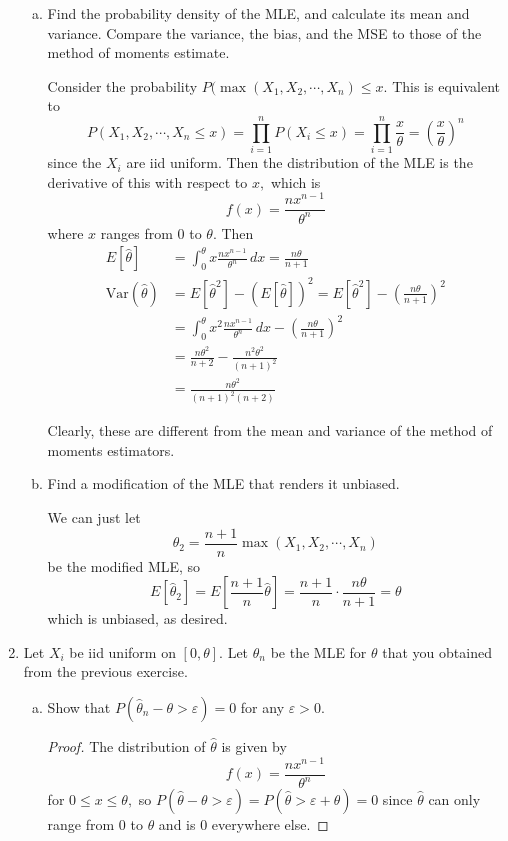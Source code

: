 \documentclass{article}
\newcommand{\var}{\mathrm{Var}}
\begin{document}
\begin{enumerate}
\begin{enumerate}[a.]
			\item Find the probability density of the MLE, and calculate its mean and variance. Compare the variance, the bias, and the MSE to those of the method of moments estimate.
				\begin{soln}
					Consider the probability $P(\max{(X_1, X_2, \cdots, X_n)\le x}.$ This is equivalent to \[P(X_1, X_2, \cdots, X_n\le x) = \prod_{i=1}^n P(X_i\le x) = \prod_{i=1}^n \frac{x}{\theta} = \left( \frac{x}{\theta} \right)^n\] since the $X_i$ are iid uniform. Then the distribution of the MLE is the derivative of this with respect to $x,$ which is \[f(x) = \frac{nx^{n-1}}{\theta^n}\] where $x$ ranges from 0 to $\theta.$ Then 
					\begin{align*}
						E[\hat{\theta}] &= \int_0^\theta x\frac{nx^{n-1}}{\theta^n}\, dx = \frac{n\theta}{n+1} \\
						\var(\hat{\theta}) &= E[\hat{\theta}^2]-(E[\hat{\theta}])^2 = E[\hat{\theta}^2]-\left( \frac{n\theta}{n+1} \right)^2 \\
						&= \int_0^\theta x^2\frac{nx^{n-1}}{\theta^n}\, dx - \left( \frac{n\theta}{n+1} \right)^2 \\
						&= \frac{n\theta^2}{n+2}-\frac{n^2\theta^2}{(n+1)^2} \\
						&= \frac{n\theta^2}{(n+1)^2(n+2)}
					\end{align*}

					Clearly, these are different from the mean and variance of the method of moments estimators.

				\end{soln}

			\item Find a modification of the MLE that renders it unbiased.
				\begin{soln}
					We can just let \[\hat{\theta}_2=\frac{n+1}{n}\max{(X_1, X_2, \cdots, X_n)}\] be the modified MLE, so \[E[\hat{\theta}_2] = E\left[ \frac{n+1}{n}\hat{\theta} \right] = \frac{n+1}{n}\cdot\frac{n\theta}{n+1}=\theta\] which is unbiased, as desired.
					
				\end{soln}
				
		\end{enumerate}

	\item Let $X_i$ be iid uniform on $[0, \theta].$ Let $\hat{\theta}_n$ be the MLE for $\theta$ that you obtained from the previous exercise.

		\begin{enumerate}[a)]
			\item Show that $P(\hat{\theta}_n-\theta > \varepsilon) = 0$ for any $\varepsilon > 0.$
				\begin{proof}
					The distribution of $\hat{\theta}$ is given by \[f(x)=\frac{nx^{n-1}}{\theta^n}\] for $0\le x\le \theta,$ so $P(\hat{\theta}-\theta>\varepsilon)=P(\hat{\theta}>\varepsilon+\theta)=0$ since $\hat{\theta}$ can only range from $0$ to $\theta$ and is 0 everywhere else.
					

\end{proof}
\end{enumerate}
\end{enumerate}
\end{document}
